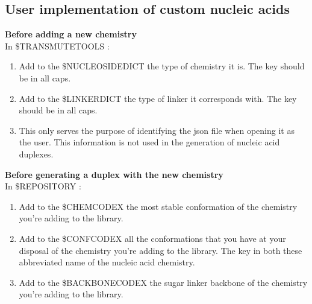\pagebreak


\subsection{User implementation of custom nucleic acids}
\textbf{Before adding a new chemistry}\\
In \$TRANSMUTETOOLS :
\begin{enumerate}
    \item Add to the \$NUCLEOSIDEDICT the type of chemistry it is. The key should be in all caps.
    \item Add to the \$LINKERDICT the type of linker it corresponds with. The key should be in all caps.
    \item This only serves the purpose of identifying the json file when opening it as the user. This information is not used in the generation of nucleic acid duplexes.
    
\end{enumerate}
\textbf{Before generating a duplex with the new chemistry}\\
In \$REPOSITORY :
\begin{enumerate}
    \item Add to the \$CHEMCODEX the most stable conformation of the chemistry you're adding to the library.
    \item Add to the \$CONFCODEX all the conformations that you have at your disposal of the chemistry you're adding to the library. The key in both these abbreviated name of the nucleic acid chemistry.
    \item Add to the \$BACKBONECODEX the sugar linker backbone of the chemistry you're adding to the library.
\end{enumerate}

